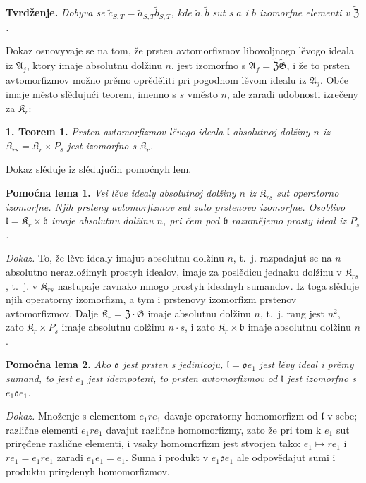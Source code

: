 \documentclass[11pt]{article}
\begin{document}
\noindent\textbf{Tvrdženje.} \emph{Dobyva se \(\tilde c_{S,T}=\tilde a_{S,T}\tilde b_{S,T}\), kde \(\tilde a,\tilde b\) sut s \(a\) i \(\bar b\) izomorfne elementi v \(\widetilde{\mathfrak Z}\).}

Dokaz osnovyvaje se na tom, že prsten avtomorfizmov libovoljnogo lěvogo ideala iz \(\mathfrak A_j\), ktory imaje absolutnu dolžinu \(n\), jest izomorfno s \(\mathfrak A_f=\widetilde{\mathfrak Z}\widetilde{\mathfrak G}\), i že to prsten avtomorfizmov možno prěmo oprěděliti pri pogodnom lěvom idealu iz \(\mathfrak A_j\). Obće imaje město slědujući teorem, imenno s \(s\) vměsto \(n\), ale zaradi udobnosti izrečeny za \(\mathfrak K_r\):

\noindent\textbf{1. Teorem 1.} \emph{Prsten avtomorfizmov lěvogo ideala \(\mathfrak l\) absolutnoj dolžiny \(n\) iz \(\mathfrak K_{rs}=\mathfrak K_r\times P_s\) jest izomorfno s \(\mathfrak K_r\).}

Dokaz slěduje iz slědujućih pomoćnyh lem.

\noindent\textbf{Pomoćna lema 1.} \emph{Vsi lěve idealy absolutnoj dolžiny \(n\) iz \(\mathfrak K_{rs}\) sut operatorno izomorfne. Njih prsteny avtomorfizmov sut zato prstenovo izomorfne. Osoblivo \(\mathfrak l=\mathfrak K_r\times\mathfrak b\) imaje absolutnu dolžinu \(n\), pri čem pod \(\mathfrak b\) razumějemo prosty ideal iz \(P_s\).}

\noindent\emph{Dokaz.} To, že lěve idealy imajut absolutnu dolžinu \(n\), t.~j. razpadajut se na \(n\) absolutno nerazložimyh prostyh idealov, imaje za poslědicu jednaku dolžinu v \(\mathfrak K_{rs}\), t.~j. v \(\mathfrak K_{rs}\) nastupaje ravnako mnogo prostyh idealnyh sumandov. Iz toga slěduje njih operatorny izomorfizm, a tym i prstenovy izomorfizm prstenov avtomorfizmov. Dalje \(\mathfrak K_r=\mathfrak Z\cdot\mathfrak G\) imaje absolutnu dolžinu \(n\), t.~j. rang jest \(n^2\), zato \(\mathfrak K_r\times P_s\) imaje absolutnu dolžinu \(n\cdot s\), i zato \(\mathfrak K_r\times\mathfrak b\) imaje absolutnu dolžinu \(n\).

\noindent\textbf{Pomoćna lema 2.} \emph{Ako \(\mathfrak o\) jest prsten s jedinicoju, \(\mathfrak l=\mathfrak o e_1\) jest lěvy ideal i prěmy sumand, to jest \(e_1\) jest idempotent, to prsten avtomorfizmov od \(\mathfrak l\) jest izomorfno s \(e_1\mathfrak o e_1\).}

\noindent\emph{Dokaz.} Množenje s elementom \(e_1re_1\) davaje operatorny homomorfizm od \(\mathfrak l\) v sebe; različne elementi \(e_1re_1\) davajut različne homomorfizmy, zato že pri tom k \(e_1\) sut priręđene različne elementi, i vsaky homomorfizm jest stvorjen tako: \(e_1\mapsto re_1\) i \(re_1=e_1re_1\) zaradi \(e_1e_1=e_1\). Suma i produkt v \(e_1\mathfrak o e_1\) ale odpovědajut sumi i produktu priręđenyh homomorfizmov.
\end{document}
